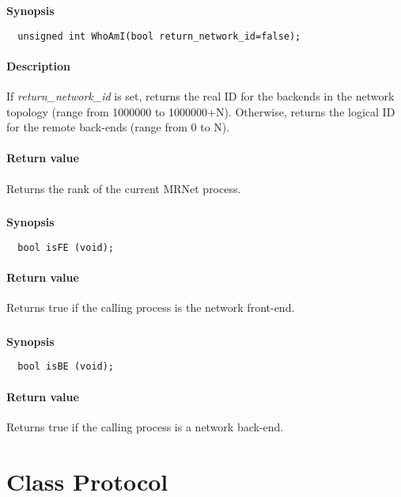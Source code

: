 \documentclass[twoside,a4,english,11pt]{book}
\begin{document}
\textbf{Synopsis}
\begin{lstlisting}
  unsigned int WhoAmI(bool return_network_id=false);
\end{lstlisting}

\paragraph{Description}
  If \emph{return\_network\_id} is set, returns the real ID for the backends in the network topology 
  (range from 1000000 to 1000000+N). Otherwise, returns the logical ID for the remote back-ends 
  (range from 0 to N).

\paragraph{Return value}
  Returns the rank of the current MRNet process.
 
\subsubsection{}

\textbf{Synopsis}
\begin{lstlisting}
  bool isFE (void);
\end{lstlisting}
      
\paragraph{Return value}
  Returns true if the calling process is the network front-end.
     
\subsubsection{}

\textbf{Synopsis}
\begin{lstlisting}
  bool isBE (void);
\end{lstlisting}
  
\paragraph{Return value}
  Returns true if the calling process is a network back-end.
  
\section{Class Protocol}
\label{sec:Protocol}
\end{document}
